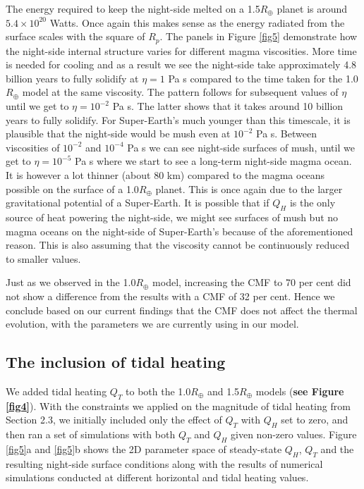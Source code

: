 \documentclass[fleqn,usenatbib]{mnras}
\begin{document}
The energy required to keep the night-side melted on a 1.5$R_{\oplus}$ planet is around $5.4 \times 10^{20}$ Watts. Once again this makes sense as the energy radiated from the surface scales with the square of $R_{p}$. The panels in Figure \ref{fig5} demonstrate how the night-side internal structure varies for different magma viscosities. More time is needed for cooling and as a result we see the night-side take approximately 4.8 billion years to fully solidify at $\eta = 1$ Pa s compared to the time taken for the 1.0$R_{\oplus}$ model at the same viscosity. The pattern follows for subsequent values of $\eta$ until we get to $\eta = 10^{-2}$ Pa s. The latter shows that it takes around 10 billion years to fully solidify. For Super-Earth's much younger than this timescale, it is plausible that the night-side would be mush even at $10^{-2}$ Pa s. Between viscosities of $10^{-2}$ and $10^{-4}$ Pa s we can see night-side surfaces of mush, until we get to $\eta = 10^{-5}$ Pa s where we start to see a long-term night-side magma ocean. It is however a lot thinner (about 80 km) compared to the magma oceans possible on the surface of a 1.0$R_{\oplus}$ planet. This is once again due to the larger gravitational potential of a Super-Earth. It is possible that if $Q_{H}$ is the only source of heat powering the night-side, we might see surfaces of mush but no magma oceans on the night-side of Super-Earth's because of the aforementioned reason. This is also assuming that the viscosity cannot be continuously reduced to smaller values. 

Just as we observed in the 1.0$R_{\oplus}$ model, increasing the CMF to 70 per cent did not show a difference from the results with a CMF of 32 per cent. Hence we conclude based on our current findings that the CMF does not affect the thermal evolution, with the parameters we are currently using in our model. 



\subsection{The inclusion of tidal heating}   \label{sec3.3}

We added tidal heating $Q_{T}$ to both the 1.0$R_{\oplus}$ and 1.5$R_{\oplus}$ models (\textbf{see Figure \ref{fig4}}). With the constraints we applied on the magnitude of tidal heating from Section 2.3, we initially included only the effect of $Q_{T}$ with $Q_{H}$ set to zero, and then ran a set of simulations with both $Q_{T}$ and $Q_{H}$ given non-zero values. Figure \ref{fig5}a and \ref{fig5}b shows the 2D parameter space of steady-state $Q_{H}$, $Q_{T}$ and the resulting night-side surface conditions along with the results of numerical simulations conducted at different horizontal and tidal heating values. 
\end{document}
